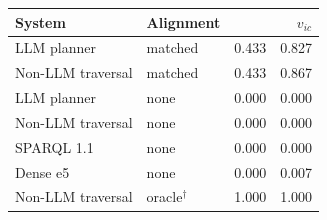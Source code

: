 {\setlength{\tabcolsep}{3pt}\small%
\begin{tabular}{llrr}
\toprule
System & Alignment & \ac{} & $v_{ic}$ \\
\midrule
LLM planner & matched & 0.433 & 0.827 \\
Non-LLM traversal & matched & 0.433 & 0.867 \\
LLM planner & none & 0.000 & 0.000 \\
Non-LLM traversal & none & 0.000 & 0.000 \\
SPARQL 1.1 & none & 0.000 & 0.000 \\
Dense e5 & none & 0.000 & 0.007 \\
Non-LLM traversal & oracle$^{\dagger}$ & 1.000 & 1.000 \\
\bottomrule
\end{tabular}}